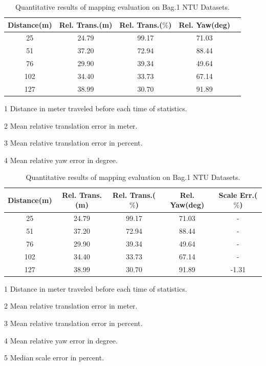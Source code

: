 \begin{table}
	\centering
	\caption{Quantitative results of mapping evaluation on Bag.1 NTU Datasets.}
	\begin{threeparttable}
		
		\begin{tabular}{|c|c|c|c|c|}
			\hline
			Distance(m)\tnote{1} & Rel. Trans.(m)\tnote{2}  & Rel. Trans.($\%$)\tnote{3} & Rel. Yaw(deg)\tnote{4}   \\
			\hline
			25& 24.79 & 99.17 & 71.03 \\
			\hline
			51&37.20& 72.94 & 88.44  \\
			\hline
			76&29.90& 39.34 & 49.64  \\
			\hline
			102&34.40&33.73& 67.14  \\
			\hline
			127&38.99& 30.70 & 91.89 \\
			\hline
		\end{tabular}
		\begin{tablenotes}
			\footnotesize
			\item[1] Distance in meter traveled before each time of statistics. 
			\item[2] Mean relative translation error in meter.
			\item[3] Mean relative translation error in percent.
			\item[4] Mean relative yaw error in degree.
		\end{tablenotes}
	
	\ifoutputscaleerror
	\begin{tabular}{|c|c|c|c|c|}
		\hline
		Distance(m)\tnote{1} & Rel. Trans.(m)\tnote{2}  & Rel. Trans.($\%$)\tnote{3} & Rel. Yaw(deg)\tnote{4} & Scale Err.($\%$)\tnote{5}  \\
		\hline
		25& 24.79 & 99.17 & 71.03 & - \\
		\hline
		51&37.20& 72.94 & 88.44 & - \\
		\hline
		76&29.90& 39.34 & 49.64 & - \\
		\hline
		102&34.40&33.73& 67.14 & - \\
		\hline
		127&38.99& 30.70 & 91.89 & -1.31\\
		\hline
	\end{tabular}
	\begin{tablenotes}
		\footnotesize
		\item[1] Distance in meter traveled before each time of statistics. 
		\item[2] Mean relative translation error in meter.
		\item[3] Mean relative translation error in percent.
		\item[4] Mean relative yaw error in degree.
		\item[5] Median scale error in percent.
	\end{tablenotes}
\fi
	\end{threeparttable}
	\label{tbl:ntubag1quanresult}
\end{table}

